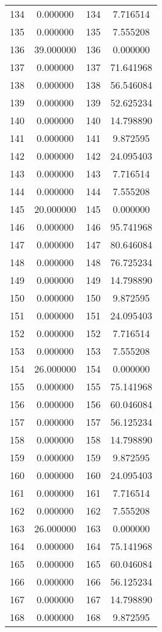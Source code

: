\documentclass[12pt]{article}
\begin{document}
\begin{longtable}{@{}cccc@{}}
134 & 0.000000 & 134 & 7.716514 \\
135 & 0.000000 & 135 & 7.555208 \\
136 & 39.000000 & 136 & 0.000000 \\
137 & 0.000000 & 137 & 71.641968 \\
138 & 0.000000 & 138 & 56.546084 \\
139 & 0.000000 & 139 & 52.625234 \\
140 & 0.000000 & 140 & 14.798890 \\
141 & 0.000000 & 141 & 9.872595 \\
142 & 0.000000 & 142 & 24.095403 \\
143 & 0.000000 & 143 & 7.716514 \\
144 & 0.000000 & 144 & 7.555208 \\
145 & 20.000000 & 145 & 0.000000 \\
146 & 0.000000 & 146 & 95.741968 \\
147 & 0.000000 & 147 & 80.646084 \\
148 & 0.000000 & 148 & 76.725234 \\
149 & 0.000000 & 149 & 14.798890 \\
150 & 0.000000 & 150 & 9.872595 \\
151 & 0.000000 & 151 & 24.095403 \\
152 & 0.000000 & 152 & 7.716514 \\
153 & 0.000000 & 153 & 7.555208 \\
154 & 26.000000 & 154 & 0.000000 \\
155 & 0.000000 & 155 & 75.141968 \\
156 & 0.000000 & 156 & 60.046084 \\
157 & 0.000000 & 157 & 56.125234 \\
158 & 0.000000 & 158 & 14.798890 \\
159 & 0.000000 & 159 & 9.872595 \\
160 & 0.000000 & 160 & 24.095403 \\
161 & 0.000000 & 161 & 7.716514 \\
162 & 0.000000 & 162 & 7.555208 \\
163 & 26.000000 & 163 & 0.000000 \\
164 & 0.000000 & 164 & 75.141968 \\
165 & 0.000000 & 165 & 60.046084 \\
166 & 0.000000 & 166 & 56.125234 \\
167 & 0.000000 & 167 & 14.798890 \\
168 & 0.000000 & 168 & 9.872595 \\

\end{longtable}
\end{document}
